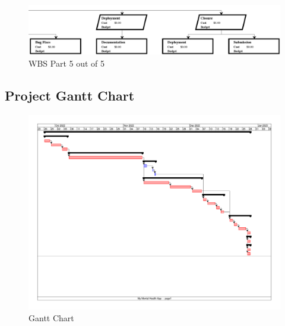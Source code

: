 \documentclass[11pt]{article}
\begin{document}
    \begin{figure}[H]
        \centering
        \includegraphics[width=\textwidth]{ProjectLibre/WBS as PNG/Pages from My Mental Health App WBS-5_Page_5}
        \caption{WBS Part 5 out of 5}
        \label{fig:figure11}
    \end{figure}
%    

    \subsection{Project Gantt Chart}\label{subsec:project-gantt-chart}

    \begin{figure}[H]
        \centering
        \includegraphics[angle=90,origin=c,height=0.7\textheight]{ProjectLibre/My Mental Health App Gantt}
        \caption{Gantt Chart}
        \label{fig:figure12}
    \end{figure}
%    

    \pagebreak
\end{document}
